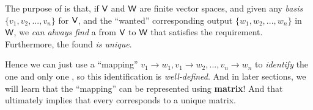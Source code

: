 \begin{remark} \label{remark 2.1.12}
The purpose of  is that, if \(\textsf{V}\) and \(\textsf{W}\) are finite vector spaces, and given any \emph{basis} \(\{ v_1, v_2, ..., v_n \}\) for \(\textsf{V}\), and the ``wanted'' corresponding output \(\{ w_1, w_2, ..., w_n \}\) in \(\textsf{W}\), we \emph{can always find} a \LTRAN{} from \(\textsf{V}\) to \(\textsf{W}\) that satisfies the requirement.
Furthermore, the found \LTRAN{} \emph{is unique}.

Hence we can just use a ``mapping'' \(v_1 \to w_1, v_1 \to w_2, ..., v_n \to w_n\) to \emph{identify} the one and only one \LTRAN{}, so this identification is \emph{well-defined}.
And in later sections, we will learn that the ``mapping'' can be represented using \textbf{matrix}!
And that ultimately implies that every \LTRAN{} corresponds to a unique matrix.
\end{remark}

